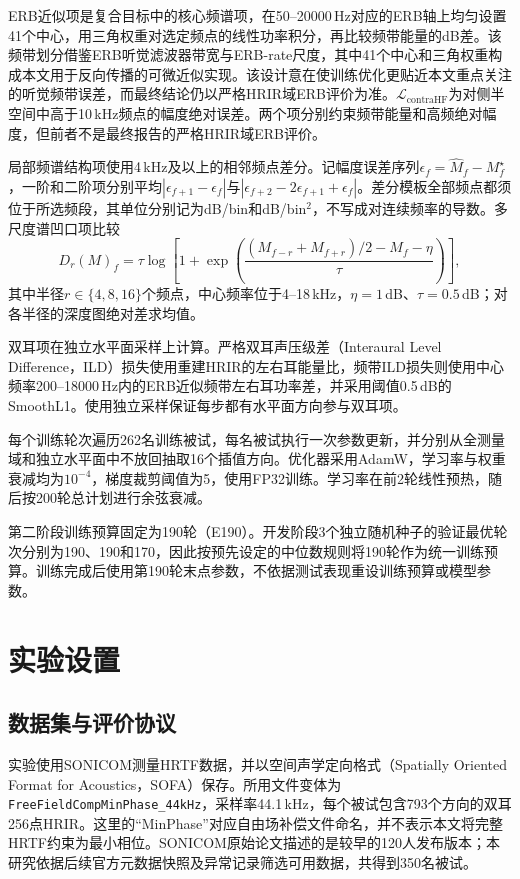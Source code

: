 \documentclass[UTF8,a4paper]{article}
\begin{document}
ERB近似项是复合目标中的核心频谱项，在50--20000\,Hz对应的ERB轴上均匀设置41个中心，用三角权重对选定频点的线性功率积分，再比较频带能量的dB差。该频带划分借鉴ERB听觉滤波器带宽与ERB-rate尺度\cite{R23}，其中41个中心和三角权重构成本文用于反向传播的可微近似实现。该设计意在使训练优化更贴近本文重点关注的听觉频带误差，而最终结论仍以严格HRIR域ERB评价为准。$\mathcal L_{\mathrm{contraHF}}$为对侧半空间中高于10\,kHz频点的幅度绝对误差。两个项分别约束频带能量和高频绝对幅度，但前者不是最终报告的严格HRIR域ERB评价。

局部频谱结构项使用4\,kHz及以上的相邻频点差分。记幅度误差序列$\epsilon_f=\widehat M_f-M^\star_f$，一阶和二阶项分别平均$|\epsilon_{f+1}-\epsilon_f|$与$|\epsilon_{f+2}-2\epsilon_{f+1}+\epsilon_f|$。差分模板全部频点都须位于所选频段，其单位分别记为dB/bin和dB/bin$^2$，不写成对连续频率的导数。多尺度谱凹口项比较
\begin{equation}
D_r(M)_f=\tau\log\!\left[
1+\exp\!\left(
\frac{(M_{f-r}+M_{f+r})/2-M_f-\eta}{\tau}
\right)\right],
\end{equation}
其中半径$r\in\{4,8,16\}$个频点，中心频率位于4--18\,kHz，$\eta=1$\,dB、$\tau=0.5$\,dB；对各半径的深度图绝对差求均值。

双耳项在独立水平面采样上计算。严格双耳声压级差（Interaural Level Difference，ILD）损失使用重建HRIR的左右耳能量比，频带ILD损失则使用中心频率200--18000\,Hz内的ERB近似频带左右耳功率差，并采用阈值0.5\,dB的SmoothL1。使用独立采样保证每步都有水平面方向参与双耳项。

每个训练轮次遍历262名训练被试，每名被试执行一次参数更新，并分别从全测量域和独立水平面中不放回抽取16个插值方向。优化器采用AdamW，学习率与权重衰减均为$10^{-4}$，梯度裁剪阈值为5，使用FP32训练。学习率在前2轮线性预热，随后按200轮总计划进行余弦衰减。

第二阶段训练预算固定为190轮（E190）。开发阶段3个独立随机种子的验证最优轮次分别为190、190和170，因此按预先设定的中位数规则将190轮作为统一训练预算。训练完成后使用第190轮末点参数，不依据测试表现重设训练预算或模型参数。

\section{实验设置}
\label{sec:setup}

\subsection{数据集与评价协议}
实验使用SONICOM测量HRTF数据\cite{R6}，并以空间声学定向格式（Spatially Oriented Format for Acoustics，SOFA）保存\cite{R8}。所用文件变体为\texttt{FreeFieldCompMinPhase\_44kHz}，采样率44.1\,kHz，每个被试包含793个方向的双耳256点HRIR。这里的“MinPhase”对应自由场补偿文件命名，并不表示本文将完整HRTF约束为最小相位。SONICOM原始论文描述的是较早的120人发布版本；本研究依据后续官方元数据快照及异常记录筛选可用数据，共得到350名被试。
\end{document}
